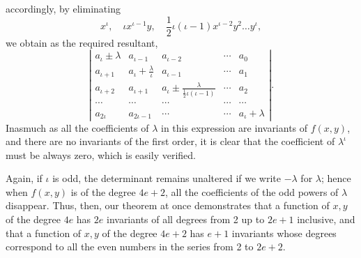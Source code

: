 \documentclass[11pt]{article}
\newcommand{\sourcepage}[1]{\marginpar{\scriptsize p.~#1}}
\begin{document}
\sourcepage{277}
accordingly, by eliminating
\[
x^\iota,\quad \iota x^{\iota-1}y,\quad \frac12\iota(\iota-1)x^{\iota-2}y^2\ldots y^\iota,
\]
we obtain as the required resultant\footnotemark,
\[
\left|\begin{array}{ccccc}
a_\iota\pm\lambda&a_{\iota-1}&a_{\iota-2}&\cdots&a_0\\
a_{\iota+1}&a_\iota+\frac{\lambda}{\iota}&a_{\iota-1}&\cdots&a_1\\
a_{\iota+2}&a_{\iota+1}&a_\iota\pm\frac{\lambda}{\frac12\iota(\iota-1)}&\cdots&a_2\\
\cdots&\cdots&\cdots&\cdots&\cdots\\
a_{2\iota}&a_{2\iota-1}&\cdots&\cdots&a_\iota+\lambda
\end{array}\right|.
\]
Inasmuch as all the coefficients of $\lambda$ in this expression are invariants of $f(x,y)$, and there are no invariants of the first order, it is clear that the coefficient of $\lambda^\iota$ must be always zero, which is easily verified.

Again, if $\iota$ is odd, the determinant remains unaltered if we write $-\lambda$ for $\lambda$; hence when $f(x,y)$ is of the degree $4e+2$, all the coefficients of the odd powers of $\lambda$ disappear. Thus, then, our theorem at once demonstrates that a function of $x,y$ of the degree $4e$ has $2e$ invariants of all degrees from 2 up to $2e+1$ inclusive, and that a function of $x,y$ of the degree $4e+2$ has $e+1$ invariants whose degrees correspond to all the even numbers in the series from 2 to $2e+2$.
\end{document}
